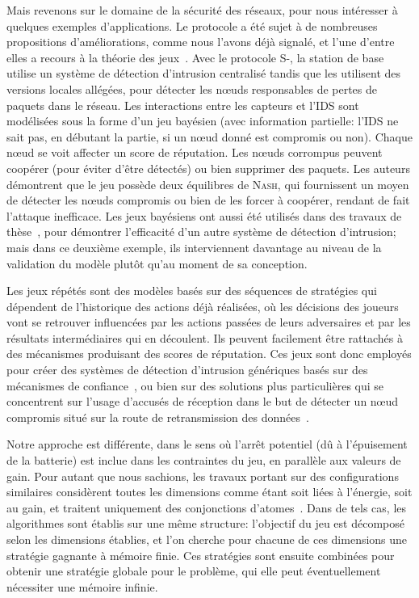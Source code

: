 Mais revenons sur le domaine de la sécurité des réseaux, pour nous intéresser à quelques exemples d'applications.
Le protocole \leach a été sujet à de nombreuses propositions d'améliorations, comme nous l'avons déjà signalé, et l'une d'entre elles a recours à la théorie des jeux~\cite{MMZ09}.
Avec le protocole S-\leach, la station de base utilise un système de détection d'intrusion centralisé tandis que les \chs utilisent des versions locales allégées, pour détecter les nœuds responsables de pertes de paquets dans le réseau.
Les interactions entre les capteurs et l'IDS sont modélisées sous la forme d'un jeu bayésien (\cad avec information partielle: l'IDS ne sait pas, en débutant la partie, si un nœud donné est compromis ou non).
Chaque nœud se voit affecter un score de réputation.
Les nœuds corrompus peuvent coopérer (pour éviter d'être détectés) ou bien supprimer des paquets.
Les auteurs démontrent que le jeu possède deux équilibres de \textsc{Nash}, qui fournissent un moyen de détecter les nœuds compromis ou bien de les forcer à coopérer, rendant de fait l'attaque inefficace.
Les jeux bayésiens ont aussi été utilisés dans des travaux de thèse~\cite{Ham12}, pour démontrer l'efficacité d'un autre système de détection d'intrusion; mais dans ce deuxième exemple, ils interviennent davantage au niveau de la validation \aposteriori du modèle plutôt qu'au moment de sa conception.

Les jeux répétés sont des modèles basés sur des séquences de stratégies qui dépendent de l'historique des actions déjà réalisées, où les décisions des joueurs vont se retrouver influencées par les actions passées de leurs adversaires et par les résultats intermédiaires qui en découlent.
Ils peuvent facilement être rattachés à des mécanismes produisant des scores de réputation.
Ces jeux sont donc employés pour créer des systèmes de détection d'intrusion génériques basés sur des mécanismes de confiance~\cite{AD07}, ou bien sur des solutions plus particulières qui se concentrent sur l'usage d'accusés de réception dans le but de détecter un nœud compromis situé sur la route de retransmission des données~\cite{Red09}.

\bigskip
Notre approche est différente, dans le sens où l'arrêt potentiel (dû à l'épuisement de la batterie) est inclue dans les contraintes du jeu, en parallèle aux valeurs de gain.
Pour autant que nous sachions, les travaux portant sur des configurations similaires considèrent toutes les dimensions comme étant soit liées à l'énergie, soit au gain, et traitent uniquement des conjonctions d'atomes~\cite{chatterjee12,velner12a}.
Dans de tels cas, les algorithmes sont établis sur une même structure: l'objectif du jeu est décomposé selon les dimensions établies, et l'on cherche pour chacune de ces dimensions une stratégie gagnante à mémoire finie.
Ces stratégies sont ensuite combinées pour obtenir une stratégie globale pour le problème, qui elle peut éventuellement nécessiter une mémoire infinie.

